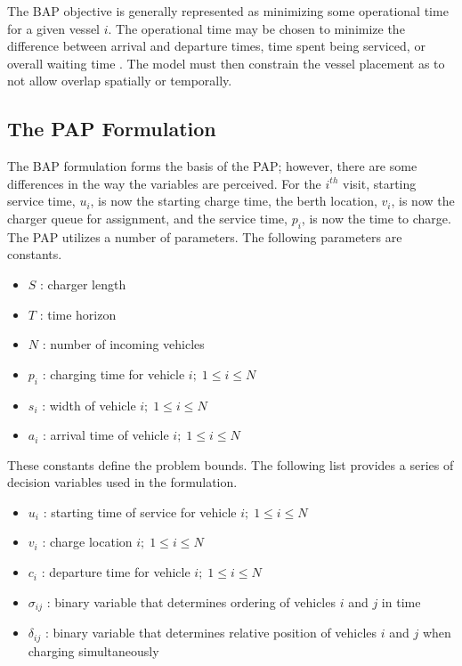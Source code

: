 \documentclass[utf8]{FrontiersinHarvard}
\begin{document}
The BAP objective is generally represented as minimizing some operational time for a given vessel $i$. The operational
time may be chosen to minimize the difference between arrival and departure times, time spent being serviced, or overall
waiting time \citep{Voss2007, Buhrkal2010,Frojan2015}. The model must then constrain the vessel placement as to not allow
overlap spatially or temporally.

\subsection{The PAP Formulation}
The BAP formulation forms the basis of the PAP; however, there are some differences in the way the variables are
perceived. For the $i^{th}$ visit, starting service time, $u_i$, is now the starting charge time, the berth location,
$v_i$, is now the charger queue for assignment, and the service time, $p_i$, is now the time to charge. The PAP utilizes
a number of parameters. The following parameters are constants.
\begin{itemize}
	\item $S$   : charger length
	\item $T$   : time horizon
	\item $N$   : number of incoming vehicles
	\item $p_i$ : charging time for vehicle $i;\; 1 \leq i \leq N$
	\item $s_i$ : width of vehicle $i;\; 1 \leq i \leq N$
	\item $a_i$ : arrival time of vehicle $i;\; 1 \leq i \leq N$
\end{itemize}
These constants define the problem bounds. The following list provides a series of decision variables used in the formulation.
\begin{itemize}
    \item $u_i$         : starting time of service for vehicle $i;\; 1 \leq i \leq N$
    \item $v_i$         : charge location $i;\; 1 \leq i \leq N$
    \item $c_i$         : departure time for vehicle $i;\; 1 \leq i \leq N$
    \item $\sigma_{ij}$ : binary variable that determines ordering of vehicles $i$ and $j$ in time
    \item $\delta_{ij}$ : binary variable that determines relative position of vehicles $i$ and $j$ when charging simultaneously
\end{itemize}
\end{document}
